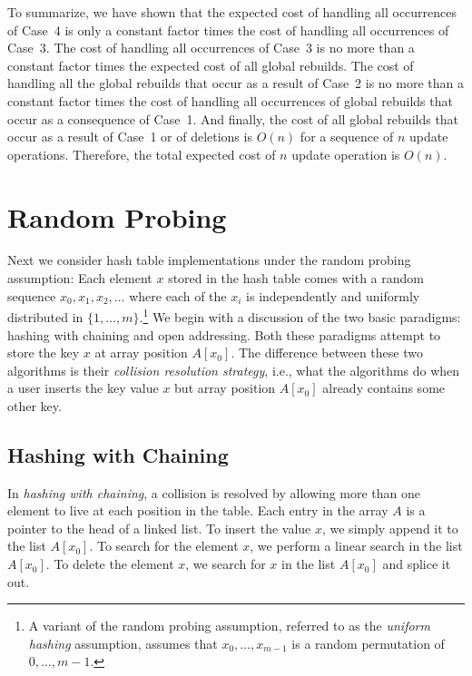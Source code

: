 To summarize, we have shown that the expected cost of handling all
occurrences of Case~4 is only  a constant factor times the cost of
handling all occurrences of Case~3.  The cost of handling all
occurrences of Case~3 is no more than a constant factor times the
expected cost of all global rebuilds.  The cost of handling all the
global rebuilds that occur as a result of Case~2 is no more than a
constant factor times the cost of handling all occurrences of global
rebuilds that occur as a consequence of Case~1.  And finally, the cost
of all global rebuilds that occur as a result of Case~1 or of
deletions is $O(n)$ for a sequence of $n$ update operations.
Therefore, the total expected cost of $n$ update operation is $O(n)$.


\section{Random Probing}
\label{hash:sec:uniform}

Next we consider hash table implementations under the random probing
assumption: Each element $x$ stored in the hash table comes with a
random sequence $x_0,x_1,x_2,\ldots$ where each of the $x_i$ is
independently and uniformly distributed in
$\{1,\ldots,m\}$.\footnote{A variant of the random probing assumption,
referred to as the \emph{uniform hashing} assumption, assumes that
$x_0,\ldots,x_{m-1}$ is a random permutation of $0,\ldots,m-1$.}  We
begin with a discussion of the two basic paradigms: hashing with
chaining and open addressing.  Both these paradigms attempt to store
the key $x$ at array position $A[x_0]$.  The difference between these
two algorithms is their \emph{collision resolution
strategy}, i.e., what the
algorithms do when a user inserts the key value $x$ but array position
$A[x_0]$ already contains some other key.

\subsection{Hashing with Chaining}

In \emph{hashing with chaining}, a collision is resolved by allowing
more than one element to live at each position in the table.  Each
entry in the array $A$ is a pointer to the head of a linked list.  To
insert the value $x$, we simply append it to the list $A[x_0]$.  To
search for the element $x$, we perform a linear search in the list
$A[x_0]$. To delete the element $x$, we search for $x$ in the list
$A[x_0]$ and splice it out.

